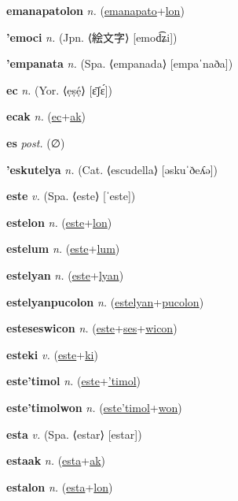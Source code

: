 \textbf{\hypertarget{emanapatolon}{emanapatolon}} \textit{n.} (\hyperlink{emanapato}{emanapato}+\allowbreak \hyperlink{lon}{lon})


\textbf{\hypertarget{'emoci}{'emoci}} \textit{n.} (Jpn. ⟨{\japanese{}絵文字}⟩ [emod͡ʑi])


\textbf{\hypertarget{'empanata}{'empanata}} \textit{n.} (Spa. ⟨empanada⟩ [empaˈnaða])


\textbf{\hypertarget{ec}{ec}} \textit{n.} (Yor. ⟨ẹṣẹ́⟩ [ɛ̄ʃɛ́])


\textbf{\hypertarget{ecak}{ecak}} \textit{n.} (\hyperlink{ec}{ec}+\allowbreak \hyperlink{ak}{ak})


\textbf{\hypertarget{es}{es}} \textit{post.} (∅)


\textbf{\hypertarget{'eskutelya}{'eskutelya}} \textit{n.} (Cat. ⟨escudella⟩ [əskuˈðeʎə])


\textbf{\hypertarget{este}{este}} \textit{v.} (Spa. ⟨este⟩ [ˈeste])


\textbf{\hypertarget{estelon}{estelon}} \textit{n.} (\hyperlink{este}{este}+\allowbreak \hyperlink{lon}{lon})


\textbf{\hypertarget{estelum}{estelum}} \textit{n.} (\hyperlink{este}{este}+\allowbreak \hyperlink{lum}{lum})


\textbf{\hypertarget{estelyan}{estelyan}} \textit{n.} (\hyperlink{este}{este}+\allowbreak \hyperlink{lyan}{lyan})


\textbf{\hypertarget{estelyanpucolon}{estelyanpucolon}} \textit{n.} (\hyperlink{estelyan}{estelyan}+\allowbreak \hyperlink{pucolon}{pucolon})


\textbf{\hypertarget{esteseswicon}{esteseswicon}} \textit{n.} (\hyperlink{este}{este}+\allowbreak \hyperlink{ses}{ses}+\allowbreak \hyperlink{wicon}{wicon})


\textbf{\hypertarget{esteki}{esteki}} \textit{v.} (\hyperlink{este}{este}+\allowbreak \hyperlink{ki}{ki})


\textbf{\hypertarget{este'timol}{este'timol}} \textit{n.} (\hyperlink{este}{este}+\allowbreak \hyperlink{'timol}{'timol})


\textbf{\hypertarget{este'timolwon}{este'timolwon}} \textit{n.} (\hyperlink{este'timol}{este'timol}+\allowbreak \hyperlink{won}{won})


\textbf{\hypertarget{esta}{esta}} \textit{v.} (Spa. ⟨estar⟩ [estar])


\textbf{\hypertarget{estaak}{estaak}} \textit{n.} (\hyperlink{esta}{esta}+\allowbreak \hyperlink{ak}{ak})


\textbf{\hypertarget{estalon}{estalon}} \textit{n.} (\hyperlink{esta}{esta}+\allowbreak \hyperlink{lon}{lon})


